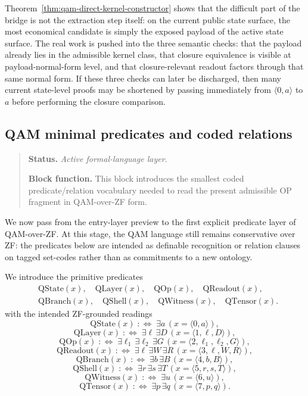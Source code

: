 \begin{remark}\label{rem:qam-direct-kernel-constructor-meaning}
Theorem~\ref{thm:qam-direct-kernel-constructor} shows that the difficult part of the bridge is not the extraction step itself: on the current public state surface, the most economical candidate is simply the exposed payload of the active state surface. The real work is pushed into the three semantic checks: that the payload already lies in the admissible kernel class, that closure equivalence is visible at payload-normal-form level, and that closure-relevant readout factors through that same normal form. If these three checks can later be discharged, then many current state-level proofs may be shortened by passing immediately from $\langle 0,a\rangle$ to $a$ before performing the closure comparison.
\end{remark}

\subsection*{QAM minimal predicates and coded relations}
\begin{quote}\small
\noindent\textbf{Status.} \emph{Active formal-language layer.}\par
\noindent\textbf{Block function.} This block introduces the smallest coded predicate/relation vocabulary needed to read the present admissible OP fragment in QAM-over-ZF form.
\end{quote}

We now pass from the entry-layer preview to the first explicit predicate layer of QAM-over-ZF. At this stage, the QAM language still remains conservative over ZF: the predicates below are intended as definable recognition or relation clauses on tagged set-codes rather than as commitments to a new ontology.

\begin{definition}
We introduce the primitive predicates
\[
\begin{aligned}
&\mathrm{QState}(x),\quad \mathrm{QLayer}(x),\quad \mathrm{QOp}(x),\quad \mathrm{QReadout}(x),\\[0.15em]
&\mathrm{QBranch}(x),\quad \mathrm{QShell}(x),\quad \mathrm{QWitness}(x),\quad \mathrm{QTensor}(x).
\end{aligned}
\]
with the intended ZF-grounded readings
\[
\mathrm{QState}(x)\;:\Longleftrightarrow\;\exists a\,(x=\langle 0,a\rangle),
\]
\[
\mathrm{QLayer}(x)\;:\Longleftrightarrow\;\exists \ell\,\exists D\,(x=\langle 1,\ell,D\rangle),
\]
\[
\mathrm{QOp}(x)\;:\Longleftrightarrow\;\exists \ell_1\,\exists \ell_2\,\exists G\,(x=\langle 2,\ell_1,\ell_2,G\rangle),
\]
\[
\mathrm{QReadout}(x)\;:\Longleftrightarrow\;\exists \ell\,\exists W\,\exists R\,(x=\langle 3,\ell,W,R\rangle),
\]
\[
\mathrm{QBranch}(x)\;:\Longleftrightarrow\;\exists b\,\exists B\,(x=\langle 4,b,B\rangle),
\]
\[
\mathrm{QShell}(x)\;:\Longleftrightarrow\;\exists r\,\exists s\,\exists T\,(x=\langle 5,r,s,T\rangle),
\]
\[
\mathrm{QWitness}(x)\;:\Longleftrightarrow\;\exists u\,(x=\langle 6,u\rangle),
\]
\[
\mathrm{QTensor}(x)\;:\Longleftrightarrow\;\exists p\,\exists q\,(x=\langle 7,p,q\rangle).
\]
\end{definition}

